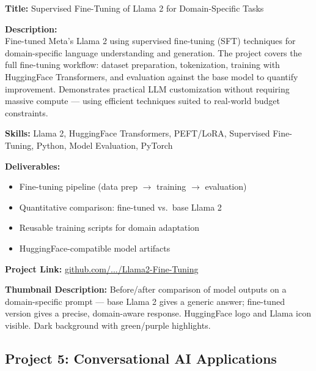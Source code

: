 \documentclass[11pt,a4paper]{article}
\newcommand{\projectentry}[1]{%
  \begin{mdframed}[backgroundcolor=LightGray, linecolor=VividPurple, linewidth=1pt,
    topline=false, bottomline=false, rightline=false,
    innerleftmargin=10pt, innerrightmargin=10pt, innertopmargin=8pt, innerbottommargin=8pt,
    skipabove=8pt, skipbelow=4pt]
  #1
  \end{mdframed}
}
\begin{document}
\projectentry{
\textbf{\textcolor{VividPurple}{Title:}} Supervised Fine-Tuning of Llama 2 for Domain-Specific Tasks

\medskip
\textbf{\textcolor{VividPurple}{Description:}}\\
Fine-tuned Meta's Llama 2 using supervised fine-tuning (SFT) techniques for domain-specific language understanding and generation. The project covers the full fine-tuning workflow: dataset preparation, tokenization, training with HuggingFace Transformers, and evaluation against the base model to quantify improvement. Demonstrates practical LLM customization without requiring massive compute --- using efficient techniques suited to real-world budget constraints.

\medskip
\textbf{\textcolor{VividPurple}{Skills:}} Llama 2, HuggingFace Transformers, PEFT/LoRA, Supervised Fine-Tuning, Python, Model Evaluation, PyTorch

\medskip
\textbf{\textcolor{VividPurple}{Deliverables:}}
\begin{itemize}
  \item Fine-tuning pipeline (data prep $\rightarrow$ training $\rightarrow$ evaluation)
  \item Quantitative comparison: fine-tuned vs.\ base Llama 2
  \item Reusable training scripts for domain adaptation
  \item HuggingFace-compatible model artifacts
\end{itemize}

\textbf{\textcolor{VividPurple}{Project Link:}} \href{https://github.com/adebanjioluwatimileyin/generative-ai-portfolio/blob/main/Fine-Tuning-LLMs/Llama2-Fine-Tuning}{github.com/.../Llama2-Fine-Tuning}

\medskip
\textbf{\textcolor{VividPurple}{Thumbnail Description:}} Before/after comparison of model outputs on a domain-specific prompt --- base Llama 2 gives a generic answer; fine-tuned version gives a precise, domain-aware response. HuggingFace logo and Llama icon visible. Dark background with green/purple highlights.
}

\subsection{Project 5: Conversational AI Applications}
\end{document}
